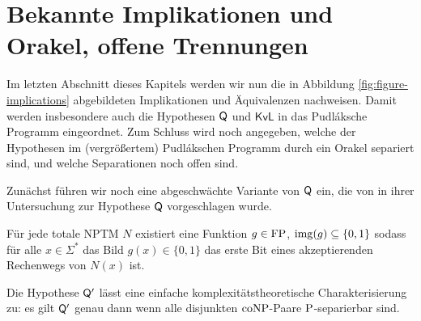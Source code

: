 \section{Bekannte Implikationen und Orakel, offene Trennungen}\label{sec:pudlak-overview}

Im letzten Abschnitt dieses Kapitels werden wir nun die in Abbildung \ref{fig:figure-implications} abgebildeten Implikationen und Äquivalenzen nachweisen.
Damit werden insbesondere auch die Hypothesen $\hQ$ und $\mathsf{KvL}$ in das Pudláksche Programm eingeordnet.
Zum Schluss wird noch angegeben, welche der Hypothesen im (vergrößertem) Pudlákschen Programm durch ein Orakel separiert sind, und welche Separationen noch offen sind.

Zunächst führen wir noch eine abgeschwächte Variante von $\hQ$ ein, die von \textcite{fenner_inverting_2003} in ihrer Untersuchung zur Hypothese $\hQ$ vorgeschlagen wurde.

\begin{conjecture}
    Für jede totale NPTM $N$ existiert eine Funktion $g\in\FP$, $\img(g)\subseteq\{0,1\}$ sodass für alle $x\in\Sigma^*$ das Bild $g(x)\in\{0,1\}$ das erste Bit eines akzeptierenden Rechenwegs von $N(x)$ ist. 
\end{conjecture}
Die Hypothese $\hQ'$ lässt eine einfache komplexitätstheoretische Charakterisierung zu: es gilt $\hQ'$ genau dann wenn alle disjunkten $\coNP$-Paare $\P$-separierbar sind.

